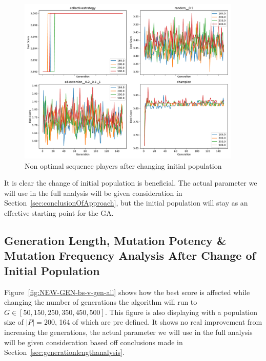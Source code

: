 \begin{figure}[ht]
    \includegraphics[width=0.95\textwidth, keepaspectratio, center]{./img/plots/NEW_INIT_POP_bs_v_gen_non_performers.pdf}
    \caption{Non optimal sequence players after changing initial population}\label{fig:NEW-INIT-POP-bs-v-gen-non-performers}
\end{figure}

It is clear the change of initial population is beneficial.
The actual parameter we will use in the full analysis will be given consideration in Section~\ref{sec:conclusionOfApproach}, but the initial population will stay as an effective starting point for the GA.

\subsection{Generation Length, Mutation Potency \& Mutation Frequency Analysis After Change of Initial Population}\label{subsec:starting_pop_analysis}
Figure~\ref{fig:NEW-GEN-bs-v-gen-all} shows how the best score is affected while changing the number of generations the algorithm will run to \(G \in [50,150,250,350,450,500] \).
This figure is also displaying with a population size of \(|P|=200\), 164 of which are pre defined.
It shows no real improvement from increasing the generations, the actual parameter we will use in the full analysis will be given consideration based off conclusions made in Section~\ref{sec:generationlengthanalysis}.

